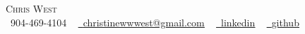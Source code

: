 \documentclass[letterpaper,11pt]{article}
\newcommand{\resumeSubHeadingListStart}{\begin{itemize}[leftmargin=0.0in, label={}]}
\newcommand{\resumeSubHeadingListEnd}{\end{itemize}}
\begin{document}

\begin{center}
    {\Huge \scshape Chris West} \\ %
    \small \raisebox{-0.1\height}\faPhone\ 904-469-4104 ~ \href{mailto:christinewwwest@gmail.com}{\raisebox{-0.2\height}\faEnvelope\  \underline{christinewwwest@gmail.com}} ~ 
    \href{https://https://www.linkedin.com/in/chris-west-code-wrangler///}{\raisebox{-0.2\height}\faLinkedin\ \underline{linkedin}}  ~
    \href{https://https://github.com/Westc13/}{\raisebox{-0.2\height}\faGithub\ \underline{github}}
    \vspace{-8pt}
\end{center}



\end{document}
